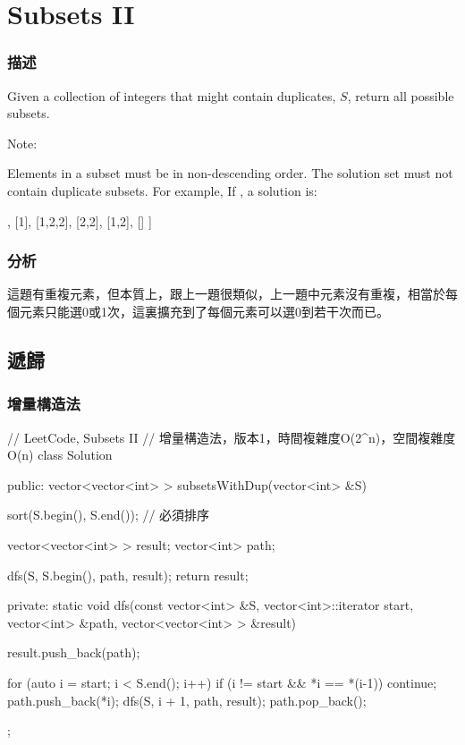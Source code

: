 \section{Subsets II} %
\label{sec:subsets-ii}


\subsubsection{描述}
Given a collection of integers that might contain duplicates, $S$, return all possible subsets.

Note:

Elements in a subset must be in non-descending order.
The solution set must not contain duplicate subsets.
For example,
If , a solution is:
\begin{Code}
[
  [2],
  [1],
  [1,2,2],
  [2,2],
  [1,2],
  []
]
\end{Code}


\subsubsection{分析}
這題有重複元素，但本質上，跟上一題很類似，上一題中元素沒有重複，相當於每個元素只能選0或1次，這裏擴充到了每個元素可以選0到若干次而已。


\subsection{遞歸}


\subsubsection{增量構造法}
\begin{Code}
// LeetCode, Subsets II
// 增量構造法，版本1，時間複雜度O(2^n)，空間複雜度O(n)
class Solution {
public:
    vector<vector<int> > subsetsWithDup(vector<int> &S) {
        sort(S.begin(), S.end());  // 必須排序

        vector<vector<int> > result;
        vector<int> path;

        dfs(S, S.begin(), path, result);
        return result;
    }

private:
    static void dfs(const vector<int> &S, vector<int>::iterator start,
            vector<int> &path, vector<vector<int> > &result) {
        result.push_back(path);

        for (auto i = start; i < S.end(); i++) {
            if (i != start && *i == *(i-1)) continue;
            path.push_back(*i);
            dfs(S, i + 1, path, result);
            path.pop_back();
        }
    }
};
\end{Code}


